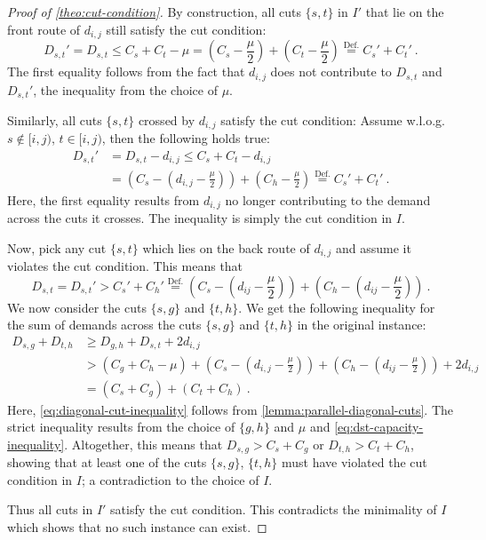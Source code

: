 \begin{proof}[Proof of \cref{theo:cut-condition}]
	By construction, all cuts $\{s, t\}$ in $I'$ that lie on the front route of $d_{i,j}$ still satisfy the cut condition:
	\begin{equation}
		D_{s,t}' = D_{s,t} \leq C_{s} + C_{t} - \mu = (C_{s} - \frac{\mu}{2}) + (C_{t} - \frac{\mu}{2}) \stackrel{\mathrm{Def.}}{=} C_{s}' + C_{t}' \ .
	\end{equation}
	The first equality follows from the fact that $d_{i,j}$ does not contribute to $D_{s,t}$ and $D_{s,t}'$, the inequality from the choice of $\mu$.
	
	Similarly, all cuts $\{s, t\}$ crossed by $d_{i,j}$ satisfy the cut condition:
	Assume w.l.o.g. $s \notin [i, j)$, $t \in [i, j)$, then the following holds true:
	\begin{align}
		D_{s,t}' &= D_{s,t} - d_{i,j} \leq C_s + C_t - d_{i,j} \\
		&= \left(C_s - \left(d_{i,j} - \frac{\mu}{2}\right)\right) + \left(C_h - \frac{\mu}{2}\right) \stackrel{\mathrm{Def.}}{=} C_s' + C_t' \ .
	\end{align}
	Here, the first equality results from $d_{i,j}$ no longer contributing to the demand across the cuts it crosses.
	The inequality is simply the cut condition in $I$.
	
	Now, pick any cut $\{s, t\}$ which lies on the back route of $d_{i,j}$ and assume it violates the cut condition.
	This means that
	\begin{equation}
		\label{eq:dst-capacity-inequality}
		D_{s,t} = D_{s,t}' > C_s' + C_h' \stackrel{\mathrm{Def.}}{=} \left(C_s - \left(d_{ij} - \frac{\mu}{2}\right)\right) + \left(C_h - \left(d_{ij} - \frac{\mu}{2}\right)\right) \ .
	\end{equation}
	We now consider the cuts $\{s, g\}$ and $\{t, h\}$.
	We get the following inequality for the sum of demands across the cuts $\{s, g\}$ and $\{t, h\}$ in the original instance:
	\begin{align}
		D_{s,g} + D_{t,h} &\geq D_{g,h} + D_{s,t} + 2 d_{i,j} \label{eq:diagonal-cut-inequality}\\
		&> (C_g + C_h - \mu) +  \left(C_s - \left(d_{i,j} - \frac{\mu}{2}\right)\right) + \left(C_h - \left(d_{ij} - \frac{\mu}{2}\right)\right) + 2 d_{i,j} \label{eq:strict-capacity-inequality}\\
		&= (C_s + C_g) + (C_t + C_h) \ .
	\end{align}
	Here, \ref{eq:diagonal-cut-inequality} follows from \cref{lemma:parallel-diagonal-cuts}.
	The strict inequality results from the choice of $\{g, h\}$ and $\mu$ and \cref{eq:dst-capacity-inequality}.
	Altogether, this means that $D_{s,g} > C_s + C_g$ or $D_{t,h} > C_t + C_h$, showing that at least one of the cuts $\{s, g\}$, $\{t, h\}$ must have violated the cut condition in $I$; a contradiction to the choice of $I$.
	
	Thus all cuts in $I'$ satisfy the cut condition.
	This contradicts the minimality of $I$ which shows that no such instance can exist.
\end{proof}

